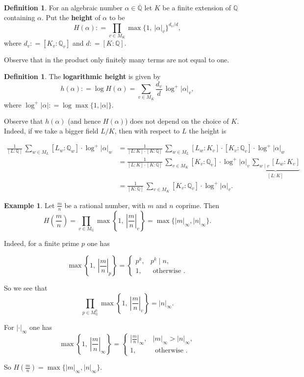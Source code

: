 \documentclass{article}
\theoremstyle{definition}
\newtheorem{example}[proposition]{Example}
\newtheorem{definition}[proposition]{Definition}
\newcommand{\term}{\textbf}
\newcommand{\dfn}{\mathrel{\mathop:}=}
\newcommand{\QQ}{\mathbb{Q}}
\begin{document}
\begin{definition}
  For an algebraic number $\alpha \in \overline{\QQ}$ let $K$ be a finite
  extension of $\QQ$ containing $\alpha$. Put the \term{height} of $\alpha$ to
  be
  $$H (\alpha) \dfn \prod_{v\in M_K} \max \{ 1, ~ |\alpha|_v \}^{d_v / d},$$
  where $d_v \dfn [K_v : \QQ_v]$ and $d \dfn [K : \QQ]$.
\end{definition}

Observe that in the product only finitely many terms are not equal to one.

\begin{definition}
  The \term{logarithmic height} is given by
  $$h (\alpha) \dfn \log H (\alpha) = \sum_{v\in M_K} \frac{d_v}{d} \, \log^+ |\alpha|_v,$$
  where $\log^+ |\alpha| \dfn \log \max \{ 1, |\alpha| \}$.
\end{definition}

Observe that $h (\alpha)$ (and hence $H (\alpha)$) does not depend on the choice
of $K$. Indeed, if we take a bigger field $L/K$, then with respect to $L$ the
height is

\begin{align*}
  \frac{1}{[L : \QQ]} \, \sum_{w\in M_L} [L_w : \QQ_w] \cdot \log^+ |\alpha|_w & = \frac{1}{[L : K]\cdot [K : \QQ]} \, \sum_{w\in M_L} [L_w : K_v] \cdot [K_v : \QQ_v] \cdot \log^+ |\alpha|_w \\
 & = \frac{1}{[L : K]\cdot [K : \QQ]}\,\sum_{v\in M_K} [K_v : \QQ_v] \cdot \log^+ |\alpha|_v \, \underbrace{\sum_{w \mid v} [L_w : K_v]}_{[L : K]} \\
 & = \frac{1}{[K : \QQ]}\,\sum_{v\in M_K} [K_v : \QQ_v] \cdot \log^+ |\alpha|_v.
\end{align*}

\begin{example}
  Let $\frac{m}{n}$ be a rational number, with $m$ and $n$ coprime. Then
  $$H \left(\frac{m}{n}\right) = \prod_{v \in M_\QQ} \max \left\{ 1, ~ \left|\frac{m}{n}\right|_v \right\} = \max \{ |m|_\infty, |n|_\infty \}.$$

  Indeed, for a finite prime $p$ one has

  \[ \max \left\{ 1, ~ \left|\frac{m}{n}\right|_p \right\} =
    \left\{\begin{array}{ll}
             p^k, & p^k \mid n,\\
             1, & \text{ otherwise }.
           \end{array}\right. \]

  So we see that
  \[ \prod_{p \in M_\QQ^0} \max \left\{ 1, ~ \left|\frac{m}{n}\right|_v \right\} = |n|_\infty. \]

  For $|\cdot|_\infty$ one has
  \[ \max \left\{ 1, ~ \left|\frac{m}{n}\right|_\infty \right\} =
    \left\{\begin{array}{ll}
             \left|\frac{m}{n}\right|_\infty, & |m|_\infty > |n|_\infty,\\
             1, & \text{ otherwise }.
           \end{array}\right. \]

  So $H (\frac{m}{n}) = \max \{ |m|_\infty, |n|_\infty \}$.
\end{example}
\end{document}
